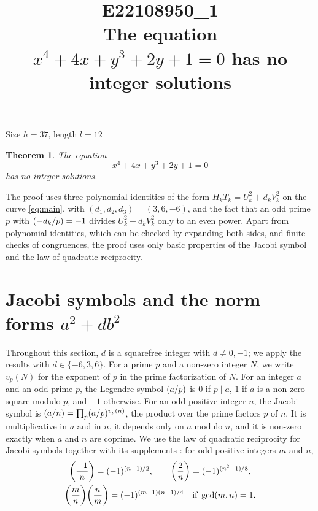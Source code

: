 \documentclass[11pt]{article}
\title{\textbf{E22108950\_1}\\[4pt] {\Large The equation $x^{4}+4x+y^{3}+2y+1=0$ has no integer solutions}}
\author{}
\date{}
\newtheorem{theorem}{Theorem}
\newcommand{\leg}[2]{\mathchoice{\biggl(\dfrac{#1}{#2}\biggr)}{(#1/#2)}{(#1/#2)}{(#1/#2)}}
\begin{document}
\maketitle
\vspace{-8ex}
\begin{center}
Size $h=37$, length $l=12$
\end{center}

\begin{theorem}\label{thm:main}
The equation
\begin{equation}\label{eq:main}
x^{4}+4x+y^{3}+2y+1=0
\end{equation}
has no integer solutions.
\end{theorem}

The proof uses three polynomial identities of the form $H_kT_k=U_k^2+d_kV_k^2$ on the curve \eqref{eq:main}, with $(d_1,d_2,d_3)=(3,6,-6)$, and the fact that an odd prime $p$ with $\leg{-d_k}{p}=-1$ divides $U_k^2+d_kV_k^2$ only to an even power. Apart from polynomial identities, which can be checked by expanding both sides, and finite checks of congruences, the proof uses only basic properties of the Jacobi symbol and the law of quadratic reciprocity.

\section{Jacobi symbols and the norm forms $a^2+db^2$}

Throughout this section, $d$ is a squarefree integer with $d\neq0,-1$; we apply the results with $d\in\{-6,3,6\}$. For a prime $p$ and a non-zero integer $N$, we write $v_p(N)$ for the exponent of $p$ in the prime factorization of $N$. For an integer $a$ and an odd prime $p$, the Legendre symbol $\leg{a}{p}$ is $0$ if $p\mid a$, $1$ if $a$ is a non-zero square modulo $p$, and $-1$ otherwise. For an odd positive integer $n$, the Jacobi symbol is $\leg{a}{n}=\prod_p\leg{a}{p}^{v_p(n)}$, the product over the prime factors $p$ of $n$. It is multiplicative in $a$ and in $n$, it depends only on $a$ modulo $n$, and it is non-zero exactly when $a$ and $n$ are coprime. We use the law of quadratic reciprocity for Jacobi symbols together with its supplements \cite[Chapter~5, \S2]{IR}: for odd positive integers $m$ and $n$,
\begin{gather*}
\leg{-1}{n}=(-1)^{(n-1)/2},\qquad\leg{2}{n}=(-1)^{(n^2-1)/8},\\
\leg{m}{n}\leg{n}{m}=(-1)^{(m-1)(n-1)/4}\quad\text{if }\gcd(m,n)=1.
\end{gather*}
\end{document}
